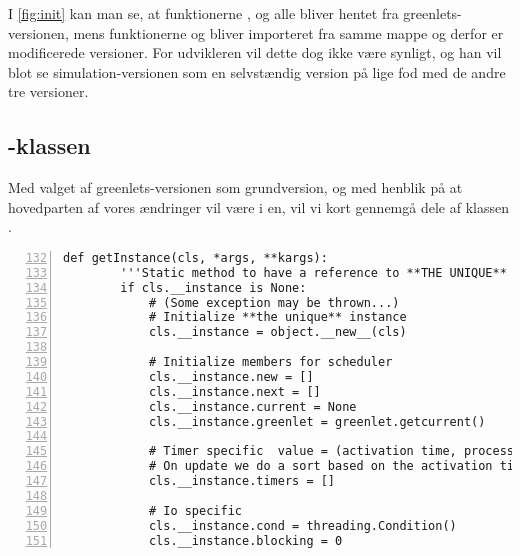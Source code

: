 I \cref{fig:init} kan man se, at funktionerne ,  og  alle bliver hentet fra greenlets-versionen, mens funktionerne  og  bliver importeret fra samme mappe og derfor er modificerede versioner. For udvikleren  vil dette dog ikke være synligt, og han vil blot se simulation-versionen som en selvstændig version på lige fod med de andre tre versioner.

\subsection{-klassen}
\label{sec:scheduler}
Med valget af greenlets-versionen som grundversion, og med henblik på at hovedparten af vores ændringer vil være i \sched en, vil vi kort gennemgå dele af klassen .

\begin{lstlisting}[firstnumber=132,stepnumber=5,numbers=left, float, label=fig:scheduling, caption=Uddrag af Scheduler.py i greenlets-versionen.]
    def getInstance(cls, *args, **kargs):
        '''Static method to have a reference to **THE UNIQUE** instance'''
        if cls.__instance is None:
            # (Some exception may be thrown...)
            # Initialize **the unique** instance
            cls.__instance = object.__new__(cls)

            # Initialize members for scheduler
            cls.__instance.new = []
            cls.__instance.next = []
            cls.__instance.current = None
            cls.__instance.greenlet = greenlet.getcurrent()

            # Timer specific  value = (activation time, process)
            # On update we do a sort based on the activation time
            cls.__instance.timers = []

            # Io specific
            cls.__instance.cond = threading.Condition()
            cls.__instance.blocking = 0
\end{lstlisting}

